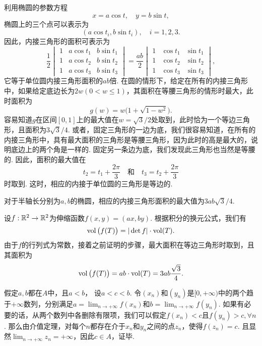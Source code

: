 \begin{ans}
  \method 利用椭圆的参数方程
   \[ x=a\cos t,\quad y=b\sin t, \]
  椭圆上的三个点可以表示为
   \[ (a\cos t_i,b\sin t_i),\quad i=1,2,3. \]
  因此，内接三角形的面积可表示为
   \[
     \frac12\begin{vmatrix}
       1 & a\cos t_1 & b\sin t_1\\
       1 & a\cos t_2 & b\sin t_2\\
       1 & a\cos t_3 & b\sin t_3
     \end{vmatrix} = \frac{ab}2
     \begin{vmatrix}
       1 & \cos t_1 & \sin t_1\\
       1 & \cos t_2 & \sin t_2\\
       1 & \cos t_3 & \sin t_3
     \end{vmatrix},
   \]
  它等于单位圆内接三角形面积的$ab$倍. 在圆的情形下，给定在所有的内接三角形中，如果给定底边长为$2w(0<w\le1)$，其面积在等腰三角形的情形时最大，此时面积为
  \[ g(w) = w\big( 1+\sqrt{1-w^2} \big). \]
  容易知道$g$在区间$[0,1]$上的最大值在$w=\sqrt3/2$处取到，此时恰为一个等边三角形，且面积为$3\sqrt3/4$. 或者，固定三角形的一边为底，我们很容易知道，在所有的内接三角形中，具有最大面积的三角形是等腰三角形，因为此时的高是最大的，说明底边上的两个角是一样的. 固定另一条边为底，我们发现此三角形也当然是等腰的. 因此，面积的最大值在
  \[ t_2=t_1+\frac{2\pi}3\quad \text{和} \quad t_3=t_2+\frac{2\pi}3 \]
  时取到. 这时，相应的内接于单位圆的三角形是等边的.

  对于半轴长分别为$a,b$的椭圆，相应的内接三角形面积的最大值为$3ab\sqrt3/4$.

  \method 设$f:\mathbb R^2\to\mathbb R^2$为伸缩函数$f(x,y)=(ax,by)$. 根据积分的换元公式，我们有
  \[ \operatorname{vol}\big(f(T)\big) = |\det f|\cdot\operatorname{vol}(T). \]
  由于$f$的行列式为常数，接着之前证明的步骤，最大面积在等边三角形时取到，且其面积为
  \[ \operatorname{vol}\big(f(T)\big) = ab\cdot\operatorname{vol}(T)=3ab\frac{\sqrt3}4. \]
\end{ans}

\begin{ans}
  假定$a,b$都在$A$中，且$a<b$， 设$a<c<b$. 令$(x_n)$和$(y_n)$是$[0,+\infty)$中的两个趋于$+\infty$数列，分别满足$a=\lim_{n\to+\infty}f(x_n)$和$b=\lim_{n\to+\infty}f(y_n)$. 如果有必要的话，从两个数列中各删除有限项，我们可以假定$f(x_n)<c$且$f(y_n)>c,\forall n$. 那么由介值定理，对每个$n$都存在介于$x_n$和$y_n$之间的点$z_n$，使得$f(z_n)=c$. 且显然$\lim_{n\to+\infty}z_n=+\infty$，因此$c\in A$，证毕.
\end{ans}

